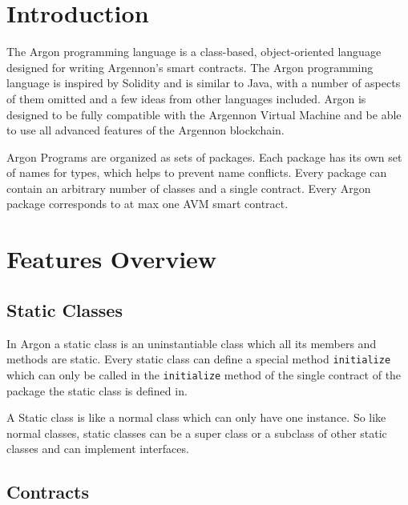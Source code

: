 

\section{Introduction}\label{sec:introduction2}

The Argon programming language is a class-based, object-oriented language designed for writing Argennon's smart
contracts. The Argon programming language is inspired by Solidity and is similar to Java, with a number of aspects
of them omitted and a few ideas from other languages included. Argon is designed to be fully compatible with
the Argennon Virtual Machine and be able to use all advanced features of the Argennon blockchain.

Argon Programs are organized as sets of packages. Each package has its own set of names for types, which helps
to prevent name conflicts. Every package can contain an arbitrary number of classes and a single contract. Every
Argon package corresponds to at max one AVM smart contract.


\section{Features Overview}\label{sec:features-overview}

\subsection{Static Classes}\label{subsec:static-classes}

In Argon a static class is an uninstantiable class which all its members and methods are static. Every static
class can define a special method \texttt{initialize} which can only be called in the \texttt{initialize}
method of the single contract of the package the static class is defined in.

A Static class is like a normal class which can only have one instance. So like normal classes, static classes can
be a super class or a subclass of other static classes and can implement interfaces.

\subsection{Contracts}\label{subsec:contract}


